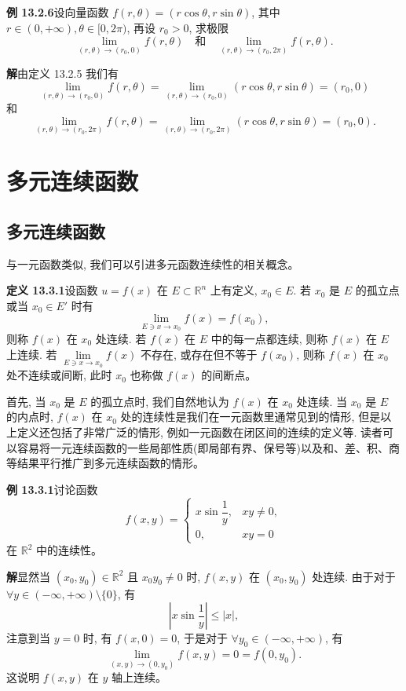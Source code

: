 \documentclass[UTF8,12pt,a4paper,fontset=fandol]{ctexart}
\begin{document}
\noindent\textbf{例 13.2.6}\quad 设向量函数 $f(r,\theta)=(r\cos\theta,r\sin\theta)$, 其中 $r\in(0,+\infty),\theta\in[0,2\pi)$, 再设 $r_0>0$, 求极限
\[
  \lim_{(r,\theta)\to(r_0,0)}f(r,\theta)
  \quad\text{和}\quad
  \lim_{(r,\theta)\to(r_0,2\pi)}f(r,\theta).
\]

\noindent\textbf{解}\quad 由定义 13.2.5 我们有
\[
  \lim_{(r,\theta)\to(r_0,0)}f(r,\theta)
  =\lim_{(r,\theta)\to(r_0,0)}(r\cos\theta,r\sin\theta)=(r_0,0)
\]
和
\[
  \lim_{(r,\theta)\to(r_0,2\pi)}f(r,\theta)
  =\lim_{(r,\theta)\to(r_0,2\pi)}(r\cos\theta,r\sin\theta)=(r_0,0).
\]

\section{多元连续函数}

\subsection{多元连续函数}

与一元函数类似, 我们可以引进多元函数连续性的相关概念。

\noindent\textbf{定义 13.3.1}\quad 设函数 $u=f(x)$ 在 $E\subset\mathbb R^n$ 上有定义, $x_0\in E$. 若 $x_0$ 是 $E$ 的孤立点或当 $x_0\in E'$ 时有
\[
  \lim_{E\ni x\to x_0}f(x)=f(x_0),
\]
则称 $f(x)$ 在 $x_0$ 处连续. 若 $f(x)$ 在 $E$ 中的每一点都连续, 则称 $f(x)$ 在 $E$ 上连续. 若 $\lim\limits_{E\ni x\to x_0}f(x)$ 不存在, 或存在但不等于 $f(x_0)$, 则称 $f(x)$ 在 $x_0$ 处不连续或间断, 此时 $x_0$ 也称做 $f(x)$ 的间断点。

首先, 当 $x_0$ 是 $E$ 的孤立点时, 我们自然地认为 $f(x)$ 在 $x_0$ 处连续. 当 $x_0$ 是 $E$ 的内点时, $f(x)$ 在 $x_0$ 处的连续性是我们在一元函数里通常见到的情形, 但是以上定义还包括了非常广泛的情形, 例如一元函数在闭区间的连续的定义等. 读者可以容易将一元连续函数的一些局部性质(即局部有界、保号等)以及和、差、积、商等结果平行推广到多元连续函数的情形。

\noindent\textbf{例 13.3.1}\quad 讨论函数
\[
  f(x,y)=
  \begin{cases}
    x\sin\dfrac1y, & xy\ne0,\\
    0, & xy=0
  \end{cases}
\]
在 $\mathbb R^2$ 中的连续性。

\noindent\textbf{解}\quad 显然当 $(x_0,y_0)\in\mathbb R^2$ 且 $x_0y_0\ne0$ 时, $f(x,y)$ 在 $(x_0,y_0)$ 处连续. 由于对于 $\forall y\in(-\infty,+\infty)\setminus\{0\}$, 有
\[
  \left|x\sin\frac1y\right|\leqslant |x|,
\]
注意到当 $y=0$ 时, 有 $f(x,0)=0$, 于是对于 $\forall y_0\in(-\infty,+\infty)$, 有
\[
  \lim_{(x,y)\to(0,y_0)}f(x,y)=0=f(0,y_0).
\]
这说明 $f(x,y)$ 在 $y$ 轴上连续。
\end{document}
